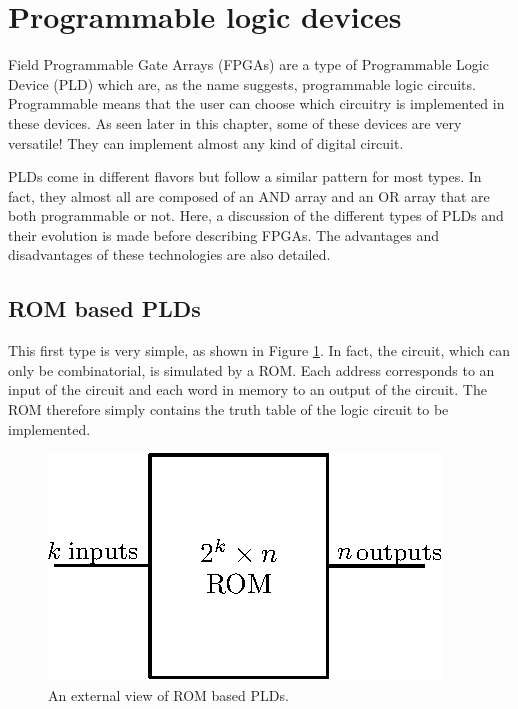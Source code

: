 \section{Programmable logic devices}

Field Programmable Gate Arrays (FPGAs) are a type of Programmable Logic Device (PLD) which are, as 
the name suggests, programmable logic circuits. Programmable means that the user can choose which 
circuitry is implemented in these devices.  As seen later in this chapter, some of 
these devices are very versatile! They can implement almost any kind of digital circuit.

PLDs come in different flavors but follow a similar pattern for most types. In fact, they almost all 
are composed of an AND array and an OR array that are both programmable or not. Here, a discussion 
of the different types of PLDs and their evolution is made before describing FPGAs. The advantages 
and disadvantages of these technologies are also detailed.

\subsection{ROM based PLDs}

This first type is very simple, as shown in Figure \ref{fig:fpga/pld_rom_external}. In fact, the 
circuit, which can only be combinatorial, is simulated by a ROM. Each address corresponds to 
an input of the circuit and each word in memory to an output of the circuit. The ROM therefore 
simply contains the truth table of the logic circuit to be implemented.

\begin{figure}[H]
    \centering
    \includegraphics[scale=1.2]{Chapter1-Hardware/res/pld_rom_external}
    \caption{An external view of ROM based PLDs.}
    \label{fig:fpga/pld_rom_external}
\end{figure}

